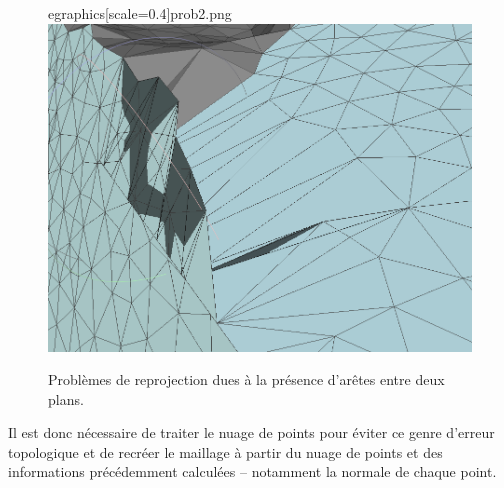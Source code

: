 ﻿\documentclass[12pt, twoside]{article}
\begin{document}
\begin{figure}[h]
egraphics[scale=0.4]{prob2.png} \includegraphics[scale=0.25]{prob3.png}
\caption{\label{fig:probproj} Problèmes de reprojection dues à la présence d'arêtes entre deux plans.}
\end{figure}

Il est donc nécessaire de traiter le nuage de points pour éviter ce genre d'erreur topologique et de recréer le maillage à partir du nuage de points et des informations précédemment calculées -- notamment la normale de chaque point.
\end{document}
